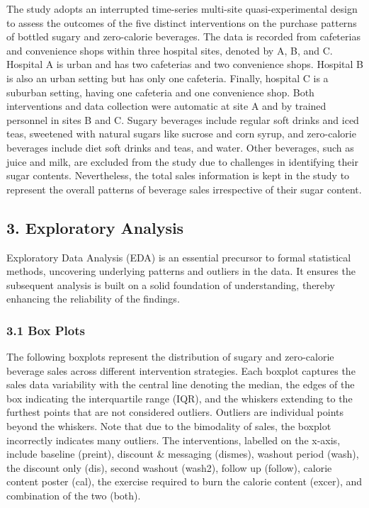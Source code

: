 \documentclass[
]{article}
\begin{document}
The study adopts an interrupted time-series multi-site
quasi-experimental design to assess the outcomes of the five distinct
interventions on the purchase patterns of bottled sugary and
zero-calorie beverages. The data is recorded from cafeterias and
convenience shops within three hospital sites, denoted by A, B, and C.
Hospital A is urban and has two cafeterias and two convenience shops.
Hospital B is also an urban setting but has only one cafeteria. Finally,
hospital C is a suburban setting, having one cafeteria and one
convenience shop. Both interventions and data collection were automatic
at site A and by trained personnel in sites B and C. Sugary beverages
include regular soft drinks and iced teas, sweetened with natural sugars
like sucrose and corn syrup, and zero-calorie beverages include diet
soft drinks and teas, and water. Other beverages, such as juice and
milk, are excluded from the study due to challenges in identifying their
sugar contents. Nevertheless, the total sales information is kept in the
study to represent the overall patterns of beverage sales irrespective
of their sugar content.

\hypertarget{exploratory-analysis}{%
\subsection{3. Exploratory Analysis}\label{exploratory-analysis}}

Exploratory Data Analysis (EDA) is an essential precursor to formal
statistical methods, uncovering underlying patterns and outliers in the
data. It ensures the subsequent analysis is built on a solid foundation
of understanding, thereby enhancing the reliability of the findings.

\hypertarget{box-plots}{%
\subsubsection{3.1 Box Plots}\label{box-plots}}

The following boxplots represent the distribution of sugary and
zero-calorie beverage sales across different intervention strategies.
Each boxplot captures the sales data variability with the central line
denoting the median, the edges of the box indicating the interquartile
range (IQR), and the whiskers extending to the furthest points that are
not considered outliers. Outliers are individual points beyond the
whiskers. Note that due to the bimodality of sales, the boxplot
incorrectly indicates many outliers. The interventions, labelled on the
x-axis, include baseline (preint), discount \& messaging (dismes),
washout period (wash), the discount only (dis), second washout (wash2),
follow up (follow), calorie content poster (cal), the exercise required
to burn the calorie content (excer), and combination of the two (both).
\end{document}
